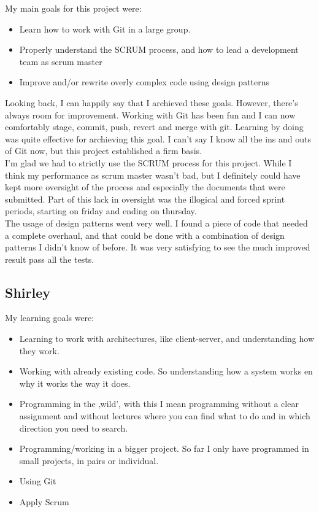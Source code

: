 \documentclass{article}
\begin{document}
\begin{enumerate}
\begin{itemize}
My main goals for this project were:

\begin{itemize}
\item Learn how to work with Git in a large group.
\item Properly understand the SCRUM process, and how to lead a development team as scrum master
\item Improve and/or rewrite overly complex code using design patterns
\end{itemize}

Looking back, I can happily say that I archieved these goals. However, there's always room for improvement. 
Working with Git has been fun and I can now comfortably stage, commit, push, revert and merge with git. Learning by doing was quite effective for archieving this goal. I can't say I know all the ins and outs of Git now, but this project established a firm basis.\\

I'm glad we had to strictly use the SCRUM process for this project. While I think my performance as scrum master wasn't bad, but I definitely could have kept more oversight of the process and especially the documents that were submitted. Part of this lack in oversight was the illogical and forced sprint periods, starting on friday and ending on thursday.\\

The usage of design patterns went very well. I found a piece of code that needed a complete overhaul, and that could be done with a combination of design patterns I didn't know of before. It was very satisfying to see the much improved result pass all the tests. 


\subsection*{Shirley}
My learning goals were:
\begin{itemize}
\item Learning to work with architectures, like client-server, and understanding how they work.
\item Working with already existing code. So understanding how a system works en why it works the way it does.
\item Programming in the ‚wild’, with this I mean programming without a clear assignment and without lectures where you can find what to do and in which direction you need to search. 
\item Programming/working in a bigger project. So far I only have programmed in small projects, in pairs or individual.
\item Using Git
\item Apply Scrum
\end{itemize}


\end{itemize}
\end{enumerate}
\end{document}

